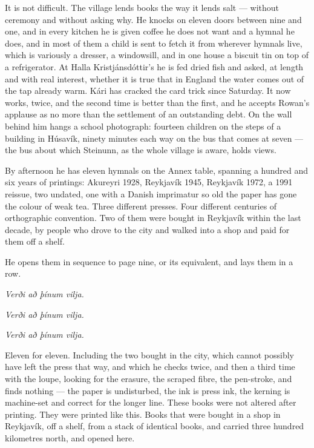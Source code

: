 \documentclass[11pt,oneside]{book}
\begin{document}
It is not difficult. The village lends books the way it lends salt ---
without ceremony and without asking why. He knocks on eleven doors
between nine and one, and in every kitchen he is given coffee he does
not want and a hymnal he does, and in most of them a child is sent to
fetch it from wherever hymnals live, which is variously a dresser, a
windowsill, and in one house a biscuit tin on top of a refrigerator. At
Halla Kristjánsdóttir's he is fed dried fish and asked, at length and
with real interest, whether it is true that in England the water comes
out of the tap already warm. Kári has cracked the card trick since
Saturday. It now works, twice, and the second time is better than the
first, and he accepts Rowan's applause as no more than the settlement of
an outstanding debt. On the wall behind him hangs a school photograph:
fourteen children on the steps of a building in Húsavík, ninety minutes
each way on the bus that comes at seven --- the bus about which
Steinunn, as the whole village is aware, holds views.

By afternoon he has eleven hymnals on the Annex table, spanning a
hundred and six years of printings: Akureyri 1928, Reykjavík 1945,
Reykjavík 1972, a 1991 reissue, two undated, one with a Danish
imprimatur so old the paper has gone the colour of weak tea. Three
different presses. Four different centuries of orthographic convention.
Two of them were bought in Reykjavík within the last decade, by people
who drove to the city and walked into a shop and paid for them off a
shelf.

He opens them in sequence to page nine, or its equivalent, and lays them
in a row.

\emph{Verði að þínum vilja.}

\emph{Verði að þínum vilja.}

\emph{Verði að þínum vilja.}

Eleven for eleven. Including the two bought in the city, which cannot
possibly have left the press that way, and which he checks twice, and
then a third time with the loupe, looking for the erasure, the scraped
fibre, the pen-stroke, and finds nothing --- the paper is undisturbed,
the ink is press ink, the kerning is machine-set and correct for the
longer line. These books were not altered after printing. They were
printed like this. Books that were bought in a shop in Reykjavík, off a
shelf, from a stack of identical books, and carried three hundred
kilometres north, and opened here.
\end{document}
